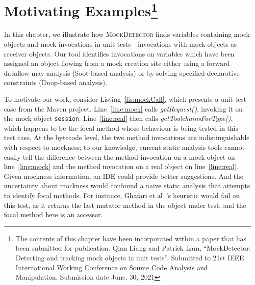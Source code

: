 \chapter[Motivating Examples]{Motivating Examples\footnote{The contents of this 
		chapter have been incorporated within a paper that has been submitted for
		publication. Qian Liang and Patrick Lam, “MockDetector: Detecting and 
		tracking mock objects in unit tests”.
		Submitted to 21st IEEE International Working Conference on 
		Source Code Analysis and Manipulation. Submission date June. 30, 2021}}
\label{chap:motivating-example}

In this chapter, we illustrate how \textsc{MockDetector} finds variables containing mock objects and mock invocations in unit tests---invocations with mock objects as receiver objects. Our tool identifies invocations on variables which have been assigned an object flowing from a mock creation site either using a forward dataflow may-analysis (Soot-based analysis) or by solving specified declarative constraints (Doop-based analysis).

To motivate our work, consider Listing~\ref{lis:mockCall}, which presents a unit test case from the Maven project. Line~\ref{line:mock} calls \textit{getRequest()}, invoking it on the mock object \texttt{session}. Line~\ref{line:real} then calls \textit{getToolchainsForType()}, which happens to be the focal method whose behaviour is being tested in this test case. At the bytecode level, the two method invocations are indistinguishable with respect to mockness; to our knowledge, current static analysis tools cannot easily tell the difference between the method invocation on a mock object on line~\ref{line:mock} and the method invocation on a real object on line~\ref{line:real}. Given mockness information, an IDE could provide better suggestions. And the uncertainty about mockness would confound a naive static analysis that attempts to identify focal methods. For instance, Ghafari et al~\cite{ghafari15:_autom}'s heuristic would fail on this test, as it returns the last mutator method in the object under test, and the focal method here is an accessor. 

